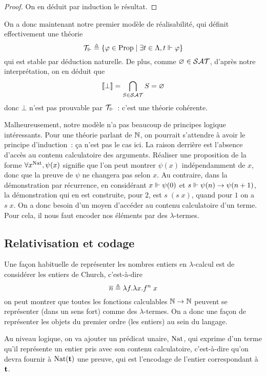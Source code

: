 \documentclass{article}
\begin{document}
\begin{proof}
  On en déduit par induction le résultat.
\end{proof}

On a donc maintenant notre premier modèle de réalisabilité, qui définit effectivement une théorie
\[\mathcal T_\Vdash \triangleq \{\varphi \in \mathrm{Prop}\mid \exists t \in \Lambda, t \Vdash \varphi\}\]
qui est stable par déduction naturelle. De plus, comme $\varnothing \in \mathcal {SAT}$, d'après notre interprétation, on en déduit que
\[\llbracket \bot \rrbracket = \bigcap_{S \in \mathcal {SAT}} S = \varnothing\]
donc $\bot$ n'est pas prouvable par $\mathcal T_\Vdash$~: c'est une théorie cohérente.

Malheureusement, notre modèle n'a pas beaucoup de principes logique intéressants. Pour une théorie parlant de $\mathbb{N}$, on pourrait s'attendre à avoir le principe d'induction~: ça n'est pas le cas ici. La raison derrière est l'absence d'accès au contenu calculatoire des arguments. Réaliser une proposition de la forme $\forall x^{\mathrm{Nat}}, \psi(x)$ signifie que l'on peut montrer $\psi(x)$ indépendamment de $x$, donc que la preuve de $\psi$ ne changera pas selon $x$. Au contraire, dans la démonstration par récurrence, en considérant $x\Vdash \psi(0)$ et $s \Vdash \psi(n) \to \psi(n+1)$, la démonstration qui en est construite, pour $2$, est $s\;(s\;x)$, quand pour $1$ on a $s\;x$. On a donc besoin d'un moyen d'accéder au contenu calculatoire d'un terme. Pour cela, il nous faut encoder nos éléments par des $\lambda$-termes.

\subsection{Relativisation et codage}

Une façon habituelle de représenter les nombres entiers en $\lambda$-calcul est de considérer les entiers de Church, c'est-à-dire
\[\overline n \triangleq \lambda f.\lambda x.f^n\;x\]
on peut montrer que toutes les fonctions calculables $\mathbb{N}\to\mathbb{N}$ peuvent se représenter (dans un sens fort) comme des $\lambda$-termes. On a donc une façon de représenter les objets du premier ordre (les entiers) au sein du langage.

Au niveau logique, on va ajouter un prédicat unaire, $\mathrm{Nat}$, qui exprime d'un terme qu'il représente un entier pris avec son contenu calculatoire, c'est-à-dire qu'on devra fournir à $\mathrm{Nat}(\mathbf{t})$ une preuve, qui est l'encodage de l'entier correspondant à $\mathbf{t}$.
\end{document}
